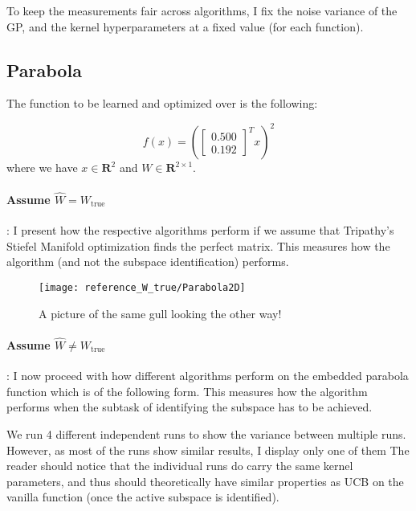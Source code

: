 To keep the measurements fair across algorithms, I fix the noise variance of the GP, and the kernel hyperparameters at a fixed value (for each function).

\subsection{Parabola}

The function to be learned and optimized over is the following:

\def\WParaboa2D{
\begin{bmatrix}
    0.500\\
    0.192
\end{bmatrix}}


\begin{equation}
f(x) = \left( \WParaboa2D^T x \right)^2
\end{equation}
where we have $x \in \mathbf{R}^2$ and $W \in \mathbf{R}^{2 \times 1}$.


\paragraph{Assume $\hat{W} = W_{\text{true}}$}: I present how the respective algorithms perform if we assume that Tripathy's Stiefel Manifold optimization finds the perfect matrix.
This measures how the algorithm (and not the subspace identification) performs.

\begin{figure}[H]
  \centering
      \texttt{[image: reference\_W\_true/Parabola2D]}
  \caption{A picture of the same gull looking the other way!}
\end{figure}

\paragraph{Assume $\hat{W} \neq W_{\text{true}}$}: I now proceed with how different algorithms perform on the embedded parabola function which is of the following form.
This measures how the algorithm performs when the subtask of identifying the subspace has to be achieved.

We run 4 different independent runs to show the variance between multiple runs.
However, as most of the runs show similar results, I display only one of them
The reader should notice that the individual runs do carry the same kernel parameters, and thus should theoretically have similar properties as UCB on the vanilla function (once the active subspace is identified).

